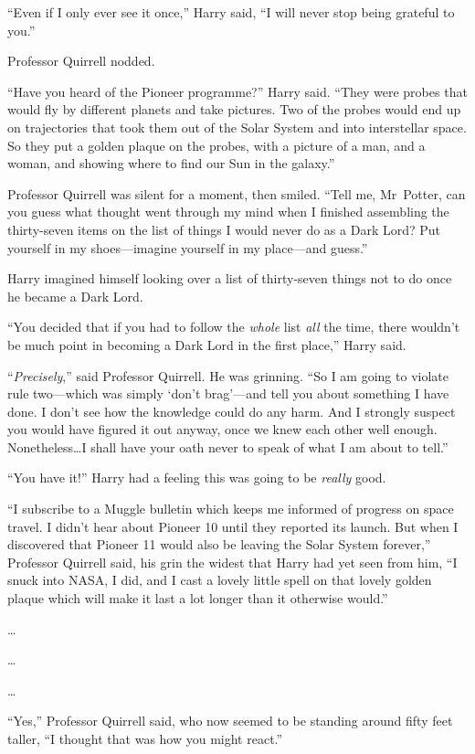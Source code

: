 “Even if I only ever see it once,” Harry said, “I will never stop being grateful to you.”

Professor Quirrell nodded.

“Have you heard of the Pioneer programme?” Harry said. “They were probes that would fly by different planets and take pictures. Two of the probes would end up on trajectories that took them out of the Solar System and into interstellar space. So they put a golden plaque on the probes, with a picture of a man, and a woman, and showing where to find our Sun in the galaxy.”

Professor Quirrell was silent for a moment, then smiled. “Tell me, Mr~Potter, can you guess what thought went through my mind when I finished assembling the thirty-seven items on the list of things I would never do as a Dark Lord? Put yourself in my shoes—imagine yourself in my place—and guess.”

Harry imagined himself looking over a list of thirty-seven things not to do once he became a Dark Lord.

“You decided that if you had to follow the \emph{whole} list \emph{all} the time, there wouldn’t be much point in becoming a Dark Lord in the first place,” Harry said.

“\emph{Precisely},” said Professor Quirrell. He was grinning. “So I am going to violate rule two—which was simply ‘don’t brag’—and tell you about something I have done. I don’t see how the knowledge could do any harm. And I strongly suspect you would have figured it out anyway, once we knew each other well enough. Nonetheless…I shall have your oath never to speak of what I am about to tell.”

“You have it!” Harry had a feeling this was going to be \emph{really} good.

“I subscribe to a Muggle bulletin which keeps me informed of progress on space travel. I didn’t hear about Pioneer 10 until they reported its launch. But when I discovered that Pioneer 11 would also be leaving the Solar System forever,” Professor Quirrell said, his grin the widest that Harry had yet seen from him, “I snuck into NASA, I did, and I cast a lovely little spell on that lovely golden plaque which will make it last a lot longer than it otherwise would.”

…

…

…

“Yes,” Professor Quirrell said, who now seemed to be standing around fifty feet taller, “I thought that was how you might react.”

